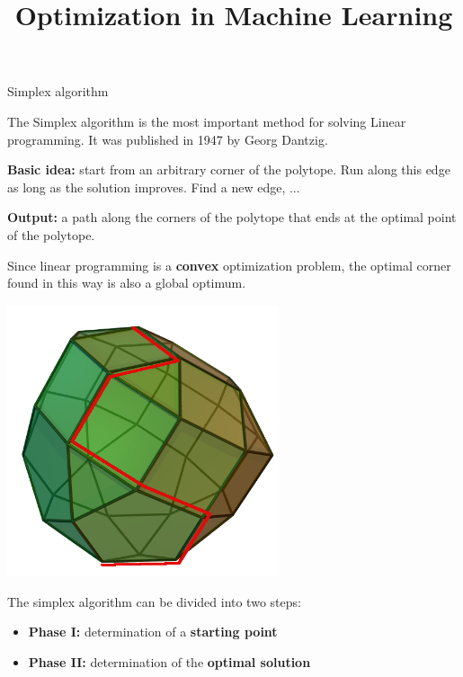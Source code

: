 \documentclass[11pt,compress,t,notes=noshow, xcolor=table]{beamer}
\title{Optimization in Machine Learning}
\date{}
\begin{document}
\sloppy
\begin{vbframe}{Simplex algorithm}

The Simplex algorithm is the most important method for solving Linear programming. It was published in 1947 by Georg Dantzig.

\lz

\textbf{Basic idea:} start from an arbitrary corner of the polytope. Run along this edge as long as the solution improves. Find a new edge, ...

\lz

\textbf{Output:} a path along the corners of the polytope that ends at the optimal point of the polytope.

\lz

Since linear programming is a \textbf{convex} optimization problem, the optimal corner found in this way is also a global optimum.

\framebreak

\begin{center}
\includegraphics[width = 0.6\textwidth]{figure_man/simplex.png}
\end{center}

\framebreak

The simplex algorithm can be divided into two steps:

\begin{itemize}
\item \textbf{Phase I:} determination of a \textbf{starting point}
\item \textbf{Phase II:} determination of the \textbf{optimal solution}
\end{itemize}


\end{vbframe}
\end{document}
